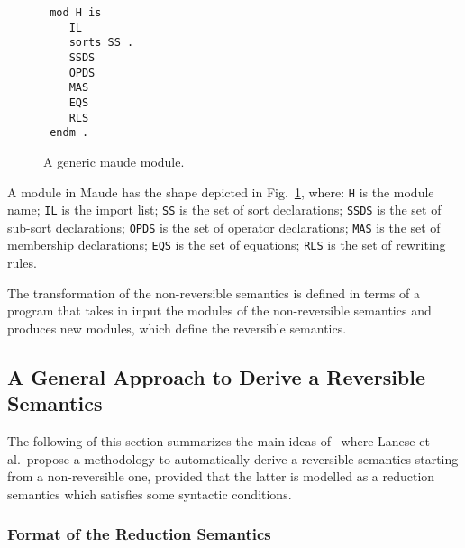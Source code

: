 \documentclass{article}[12pt,a4paper]
\theoremstyle{definition}
\begin{document}
\begin{figure}[t]
\begin{verbatim}
 mod H is
    IL
    sorts SS .
    SSDS
    OPDS
    MAS
    EQS
    RLS
 endm .
\end{verbatim}
  
  \caption{A generic maude module.}
  \label{fig:maude-module}
\end{figure}

A module in Maude has the shape depicted in Fig.~\ref{fig:maude-module}, where:
\verb+H+ is the module name; \verb+IL+ is the import list; \verb+SS+ is the set
of sort declarations; \verb+SSDS+ is the set of sub-sort declarations; \verb+OPDS+
is the set of operator declarations; \verb+MAS+ is the set of membership
declarations; \verb+EQS+ is the set of equations; \verb+RLS+ is the set of
rewriting rules. 

The transformation of the non-reversible semantics is defined in terms of a
program that takes in input the modules of the non-reversible semantics and
produces new modules, which define the reversible semantics.


\subsection{A General Approach to Derive a Reversible Semantics}\label{sec:gener-appr-derive-rev-sem}


The following of this section summarizes the main ideas of~\cite{LaneseM20}
where Lanese et al.\ propose a methodology to automatically
derive a reversible semantics starting from a non-reversible one, provided that
the latter is modelled as a reduction semantics which satisfies some syntactic conditions.

\subsubsection{Format of the Reduction Semantics}
\end{document}
